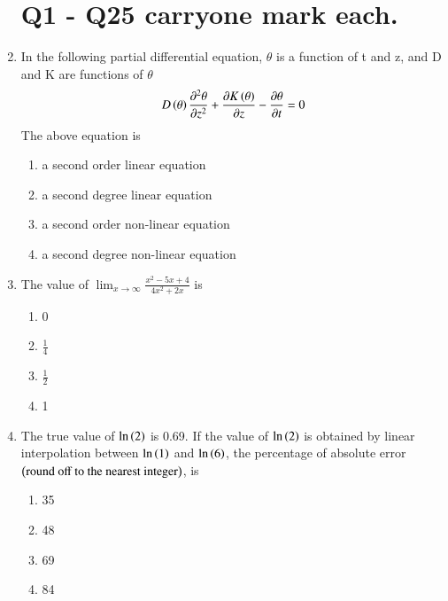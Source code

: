 \documentclass[journal]{IEEEtran}
\numberwithin{equation}{enumi}
\numberwithin{figure}{enumi}
\begin{document}
\begin{enumerate}
\section{Q1 - Q25 carryone mark each.}
\item In the following partial differential equation, $\theta$ is a function of t and z, and D and K are functions of $\theta$ \\
	\begin{align*}
		D\left(\theta\right)\frac{\partial^2\theta}{\partial z^2} + \frac{\partial K\left(\theta\right)}{\partial z} - \frac{\partial \theta}{\partial t} = 0
	\end{align*}
	The above equation is
	\begin{enumerate}
                \item a second order linear equation
                \item a second degree linear equation
                \item a second order non-linear equation
                \item a second degree non-linear equation
        \end{enumerate}
\item The value of $\lim_{x \to \infty}{\frac{x^2 - 5x + 4}{4x^2 + 2x}}$ is
	\begin{enumerate}    
                \item 0
		\item $\frac{1}{4}$
		\item $\frac{1}{2}$
                \item 1
        \end{enumerate}
\item The true value of $\ln{\ensuremath{\left(2\right)}}$ is 0.69. If the value of $\ln{\ensuremath{\left(2\right)}}$ is obtained by linear interpolation between $\ln{\ensuremath{\left(1\right)}}$ and $\ln{\ensuremath{\left(6\right)}}$, the percentage of absolute error $\left(\text{round off to the nearest integer}\right)$, is
	\begin{enumerate}                                                                              
                \item 35     
                \item 48                 
                \item 69                  
                \item 84                                 
        \end{enumerate}

\end{enumerate}
\end{document}
